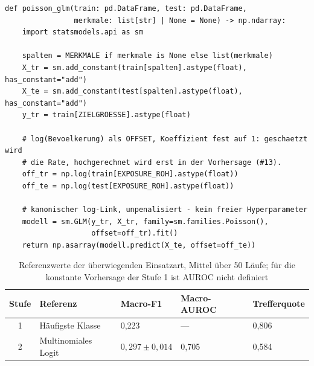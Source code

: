 \begin{lstlisting}[style=pythonstil,
  label={lst:poisson},
  caption={Poisson-Modell mit Offset, Stufe 2 der Menge
           (\texttt{vorpruefung/v1\_baselines.py}, Z.~74--108, gekürzt)}]
def poisson_glm(train: pd.DataFrame, test: pd.DataFrame,
                merkmale: list[str] | None = None) -> np.ndarray:
    import statsmodels.api as sm

    spalten = MERKMALE if merkmale is None else list(merkmale)
    X_tr = sm.add_constant(train[spalten].astype(float), has_constant="add")
    X_te = sm.add_constant(test[spalten].astype(float),  has_constant="add")
    y_tr = train[ZIELGROESSE].astype(float)

    # log(Bevoelkerung) als OFFSET, Koeffizient fest auf 1: geschaetzt wird
    # die Rate, hochgerechnet wird erst in der Vorhersage (#13).
    off_tr = np.log(train[EXPOSURE_ROH].astype(float))
    off_te = np.log(test[EXPOSURE_ROH].astype(float))

    # kanonischer log-Link, unpenalisiert - kein freier Hyperparameter
    modell = sm.GLM(y_tr, X_tr, family=sm.families.Poisson(),
                    offset=off_tr).fit()
    return np.asarray(modell.predict(X_te, offset=off_te))
\end{lstlisting}



\begin{table}[htbp]
    \centering
    \caption{Referenzwerte der überwiegenden Einsatzart, Mittel über 50 Läufe; für die konstante Vorhersage der Stufe 1 ist AUROC nicht definiert}
    \label{tab:baselines-struktur}
    \footnotesize
    \singlespacing
    \setlength{\tabcolsep}{5pt}
    \begin{tabularx}{\textwidth}{@{}c >{\raggedright\arraybackslash}X l l l@{}}
        \toprule
        \textbf{Stufe} & \textbf{Referenz} & \textbf{Macro-F1} & \textbf{Macro-AUROC} & \textbf{Trefferquote} \\
        \midrule
        1 & Häufigste Klasse & 0,223 & --- & 0,806 \\
        2 & Multinomiales Logit & $0{,}297 \pm 0{,}014$ & 0,705 & 0,584 \\
        \bottomrule
    \end{tabularx}
\end{table}


